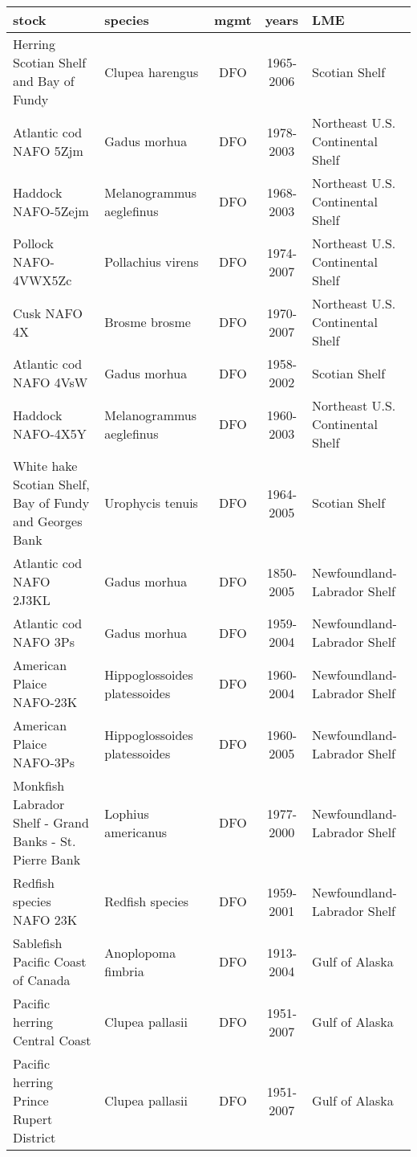 \begin{longtable}{p{4cm}p{3.5cm}ccp{5.5cm}}
  \hline
stock & species & mgmt & years & LME \\ 
  \hline
Herring Scotian Shelf and Bay of Fundy & Clupea harengus & DFO & 1965-2006 & Scotian Shelf \\ 
  Atlantic cod NAFO 5Zjm & Gadus morhua & DFO & 1978-2003 & Northeast U.S. Continental Shelf \\ 
  Haddock NAFO-5Zejm & Melanogrammus aeglefinus & DFO & 1968-2003 & Northeast U.S. Continental Shelf \\ 
  Pollock NAFO-4VWX5Zc & Pollachius virens & DFO & 1974-2007 & Northeast U.S. Continental Shelf \\ 
  Cusk NAFO 4X & Brosme brosme & DFO & 1970-2007 & Northeast U.S. Continental Shelf \\ 
  Atlantic cod NAFO 4VsW & Gadus morhua & DFO & 1958-2002 & Scotian Shelf \\ 
  Haddock NAFO-4X5Y & Melanogrammus aeglefinus & DFO & 1960-2003 & Northeast U.S. Continental Shelf \\ 
  White hake Scotian Shelf, Bay of Fundy and Georges Bank & Urophycis tenuis & DFO & 1964-2005 & Scotian Shelf \\ 
  Atlantic cod NAFO 2J3KL & Gadus morhua & DFO & 1850-2005 & Newfoundland-Labrador Shelf \\ 
  Atlantic cod NAFO 3Ps & Gadus morhua & DFO & 1959-2004 & Newfoundland-Labrador Shelf \\ 
  American Plaice NAFO-23K & Hippoglossoides platessoides & DFO & 1960-2004 & Newfoundland-Labrador Shelf \\ 
  American Plaice NAFO-3Ps & Hippoglossoides platessoides & DFO & 1960-2005 & Newfoundland-Labrador Shelf \\ 
  Monkfish Labrador Shelf - Grand Banks - St. Pierre Bank & Lophius americanus & DFO & 1977-2000 & Newfoundland-Labrador Shelf \\ 
  Redfish species NAFO 23K & Redfish species & DFO & 1959-2001 & Newfoundland-Labrador Shelf \\ 
  Sablefish Pacific Coast of Canada & Anoplopoma fimbria & DFO & 1913-2004 & Gulf of Alaska \\ 
  Pacific herring Central Coast & Clupea pallasii & DFO & 1951-2007 & Gulf of Alaska \\ 
  Pacific herring Prince Rupert District & Clupea pallasii & DFO & 1951-2007 & Gulf of Alaska \\ 

\end{longtable}
